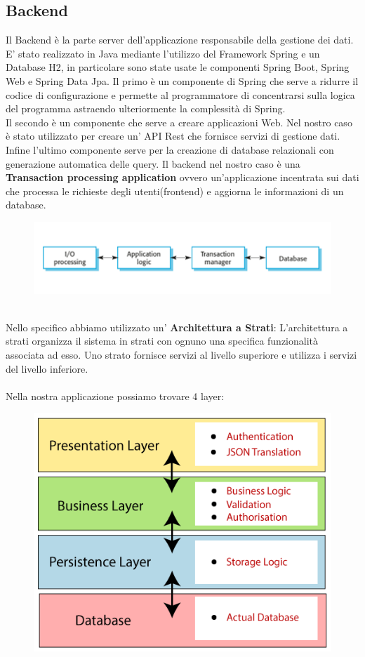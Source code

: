 \documentclass[a4paper,12pt,openany,oneside]{book}
\begin{document}
\subsection{Backend}
Il Backend è la parte server dell'applicazione responsabile della gestione dei dati.\\
E' stato realizzato in Java mediante l'utilizzo del Framework Spring e un Database H2, in particolare sono state usate le componenti Spring Boot, Spring Web e Spring Data Jpa.
Il primo è un componente di Spring che serve a ridurre il codice di configurazione e permette al programmatore di concentrarsi sulla logica del programma astraendo ulteriormente la complessità di Spring.
\\Il secondo è un componente che serve a creare applicazioni Web.
Nel nostro caso è stato utilizzato per creare un' API Rest che fornisce servizi di gestione dati.
Infine l'ultimo componente serve per la creazione di database relazionali con generazione automatica delle query.
Il backend nel nostro caso è una \textbf{Transaction processing application} ovvero un'applicazione incentrata sui dati che processa le richieste degli utenti(frontend) e aggiorna le informazioni di un database.
\begin{figure}[h] 
\centering
\includegraphics[width=0.8\columnwidth]{logic.png} 
\caption{}
\end{figure}
\\Nello specifico abbiamo utilizzato un' \textbf{Architettura a Strati}:
L'architettura a strati organizza il sistema in strati con ognuno una specifica funzionalità associata ad esso. Uno strato fornisce servizi al livello superiore e utilizza i servizi del livello inferiore.\\
\\Nella nostra applicazione possiamo trovare 4 layer:
\begin{figure}[h] 
\centering
\includegraphics[width=0.4\columnwidth]{spring-boot-architecture.png} 
\caption{}
\end{figure}\\
\end{document}
